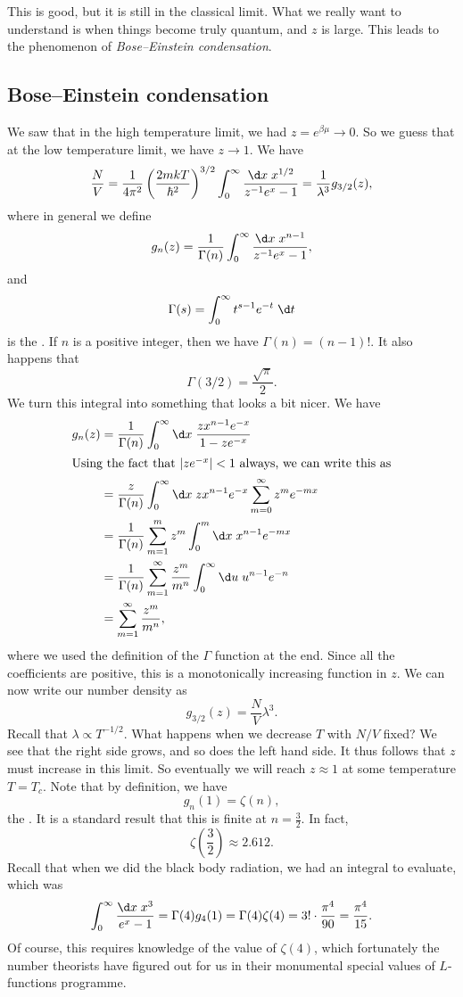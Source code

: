 \documentclass[a4paper]{article}
\begin{document}
This is good, but it is still in the classical limit. What we really want to understand is when things become truly quantum, and $z$ is large. This leads to the phenomenon of \emph{Bose--Einstein condensation}.

\subsection{Bose--Einstein condensation}
We saw that in the high temperature limit, we had $z = e^{\beta\mu} \to 0$. So we guess that at the low temperature limit, we have $z \to 1$. We have
\[
  \frac{N}{V} = \frac{1}{4 \pi^2} \left(\frac{2mkT}{\hbar^2}\right)^{3/2} \int_0^\infty \frac{\d x\; x^{1/2}}{ z^{-1} e^x - 1} = \frac{1}{\lambda^3} g_{3/2}(z),
\]
where in general we define
\[
  g_n(z) = \frac{1}{\Gamma(n)} \int_0^\infty \frac{\d x\; x^{n - 1}}{z^{-1} e^x - 1},
\]
and
\[
  \Gamma(s) = \int_0^\infty t^{s - 1} e^{-t} \;\d t
\]
is the \index{$\Gamma$}. If $n$ is a positive integer, then we have $\Gamma(n) = (n - 1)!$. It also happens that
\[
  \Gamma(3/2) = \frac{\sqrt{\pi}}{2}.
\]
We turn this integral into something that looks a bit nicer. We have
\begin{align*}
  g_n(z) &= \frac{1}{\Gamma(n)} \int_0^\infty \d x\; \frac{z x^{n - 1} e^{-x}}{1 - z e^{-x}}\\
  \intertext{Using the fact that $|z e^{-x}| < 1$ always, we can write this as}
  &= \frac{z}{\Gamma(n)} \int_0^\infty \d x\; z x^{n - 1} e^{-x} \sum_{m = 0}^\infty z^m e^{-mx}\\
  &= \frac{1}{\Gamma(n)} \sum_{m = 1}^m z^m \int_0^m \d x\; x^{n - 1} e^{-mx}\\
  &= \frac{1}{\Gamma(n)} \sum_{m = 1}^\infty \frac{z^m}{m^n}\int_0^\infty \d u\; u^{n - 1} e^{-n}\\
  &= \sum_{m = 1}^\infty \frac{z^m}{m^n},
\end{align*}
where we used the definition of the $\Gamma$ function at the end. Since all the coefficients are positive, this is a monotonically increasing function in $z$. We can now write our number density as
\[
  g_{3/2}(z) = \frac{N}{V} \lambda^3.\tag{$\dagger$}
\]
Recall that $\lambda \propto T^{-1/2}$. What happens when we decrease $T$ with $N/V$ fixed? We see that the right side grows, and so does the left hand side. It thus follows that $z$ must increase in this limit. So eventually we will reach $z \approx 1$ at some temperature $T = T_c$. Note that by definition, we have
\[
  g_n(1) = \zeta(n),
\]
the . It is a standard result that this is finite at $n = \frac{3}{2}$. In fact,
\[
  \zeta\left(\frac{3}{2}\right) \approx 2.612.
\]
Recall that when we did the black body radiation, we had an integral to evaluate, which was
\[
  \int_0^\infty \frac{\d x\; x^3}{e^x - 1} = \Gamma(4) g_4(1) = \Gamma(4) \zeta(4) = 3! \cdot \frac{\pi^4}{90} = \frac{\pi^4}{15}.
\]
Of course, this requires knowledge of the value of $\zeta(4)$, which fortunately the number theorists have figured out for us in their monumental special values of $L$-functions programme.
\end{document}

